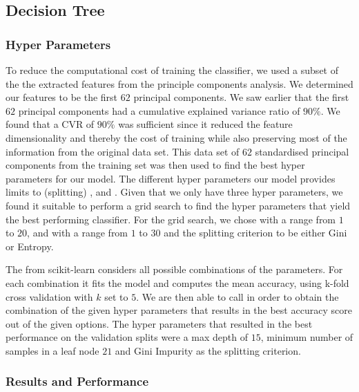 \documentclass[../main.tex]{subfiles}
\begin{document}
\subsection{Decision Tree}

\subsubsection{Hyper Parameters}

To reduce the computational cost of training the classifier, we 
used a subset of the the extracted features from the principle 
components analysis. We determined our features to be the first 
$62$ principal components. We saw earlier that the first $62$ principal components had 
a cumulative explained variance ratio of $90\%$. We found that a 
CVR of $90\%$ was sufficient since it reduced the feature 
dimensionality and thereby the cost of training while also 
preserving most of the information from the original data set.
This data set of $62$ standardised principal components from 
the training set was then used to find the best hyper parameters 
for our model. 
The different hyper parameters our model provides limits to 
(splitting) ,  and 
. 
Given that we only have three hyper parameters, we found it 
suitable to perform a grid search to find the hyper parameters 
that yield the best performing classifier. 
For the grid search, we chose  with a range 
from $1$ to $20$, and  with a range 
from $1$ to $30$ and the splitting criterion to be either Gini or 
Entropy.

The  from scikit-learn considers all 
possible combinations of the parameters. For each combination it 
fits the model and computes the mean accuracy, using k-fold cross 
validation with $k$ set to $5$. We are then able to call 
 in order to obtain the combination of 
the given hyper parameters that results in the best accuracy 
score out of the given options. 
The hyper parameters that resulted in the best performance on the 
validation splits were a max depth of $15$, minimum number of 
samples in a leaf node $21$ and Gini Impurity as the splitting 
criterion. 


\subsubsection{Results and Performance}
\end{document}
